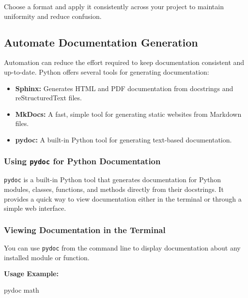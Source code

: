 \documentclass[
  letterpaper,
  DIV=11,
  numbers=noendperiod]{scrreprt}
\newenvironment{Shaded}{\begin{snugshade}}{\end{snugshade}}
\newcommand{\ExtensionTok}[1]{\textcolor[rgb]{0.00,0.23,0.31}{#1}}
\newcommand{\NormalTok}[1]{\textcolor[rgb]{0.00,0.23,0.31}{#1}}
\providecommand{\tightlist}{%
  \setlength{\itemsep}{0pt}\setlength{\parskip}{0pt}}\usepackage{longtable,booktabs,array}
\begin{document}
Choose a format and apply it consistently across your project to
maintain uniformity and reduce confusion.

\hypertarget{automate-documentation-generation}{%
\subsection{Automate Documentation
Generation}\label{automate-documentation-generation}}

Automation can reduce the effort required to keep documentation
consistent and up-to-date. Python offers several tools for generating
documentation:

\begin{itemize}
\tightlist
\item
  \textbf{Sphinx:} Generates HTML and PDF documentation from docstrings
  and reStructuredText files.
\item
  \textbf{MkDocs:} A fast, simple tool for generating static websites
  from Markdown files.
\item
  \textbf{pydoc:} A built-in Python tool for generating text-based
  documentation.
\end{itemize}

\hypertarget{using-pydoc-for-python-documentation}{%
\subsubsection{\texorpdfstring{Using \texttt{pydoc} for Python
Documentation}{Using pydoc for Python Documentation}}\label{using-pydoc-for-python-documentation}}

\texttt{pydoc} is a built-in Python tool that generates documentation
for Python modules, classes, functions, and methods directly from their
docstrings. It provides a quick way to view documentation either in the
terminal or through a simple web interface.

\hypertarget{viewing-documentation-in-the-terminal}{%
\subsubsection{Viewing Documentation in the
Terminal}\label{viewing-documentation-in-the-terminal}}

You can use \texttt{pydoc} from the command line to display
documentation about any installed module or function.

\textbf{Usage Example:}

\begin{Shaded}
\begin{Highlighting}[]
\ExtensionTok{pydoc}\NormalTok{ math}
\end{Highlighting}
\end{Shaded}
\end{document}
